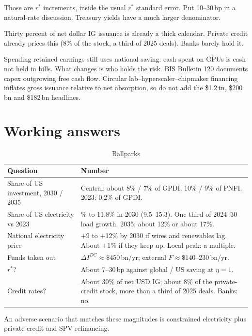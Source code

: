 \documentclass[11pt]{article}
\begin{document}
Those are $r^*$ increments, inside the usual $r^*$ standard error. Put
10--30\,bp in a natural-rate discussion. Treasury yields have a much larger
denominator.

Thirty percent of net dollar IG issuance is already a thick calendar.
Private credit already prices this (8\% of the stock, a third of 2025
deals). Banks barely hold it.

Spending retained earnings still uses national saving: cash spent on GPUs
is cash not held in bills. What changes is who holds the risk. BIS
Bulletin 120 documents capex outgrowing free cash flow. Circular
lab--hyperscaler--chipmaker financing inflates gross issuance relative to
net absorption, so do not add the \$1.2\,tn, \$200\,bn and \$182\,bn
headlines.

\section{Working answers}

\begin{table}[H]
\centering
\caption{Ballparks}
\label{tab:answers}
\begin{tabular}{>{\raggedright\arraybackslash}p{}
>{\raggedright\arraybackslash}p{}}
\toprule
Question & Number \\
\midrule
Share of US investment, 2030 / 2035 & Central: about 8\% / 7\% of
GPDI, 10\% / 9\% of PNFI. 2023: 0.2\% of GPDI. \\
Share of US electricity vs 2023 & 4.4\% to 11.8\% in 2030
(9.5--15.3). One-third of 2024--30 load growth. 2035: about 12\% or
about 17\%. \\
National electricity price & $+$9 to $+$12\% by 2030 if wires and
renewables lag. About $+$1\% if they keep up. Local peak: a multiple. \\
Funds taken out & $\Delta I^{DC}\approx\$450$\,bn/yr;
external $F\approx\$140$--230\,bn/yr. \\
$r^*$? & About 7--30\,bp against global / US saving at $\eta=1$. \\
Credit rates? & About 30\% of net USD IG; about 8\% of the
private-credit stock, more than a third of 2025 deals. Banks: no. \\
\bottomrule
\end{tabular}
\end{table}

An adverse scenario that matches these magnitudes is constrained electricity
plus private-credit and SPV refinancing.
\end{document}
